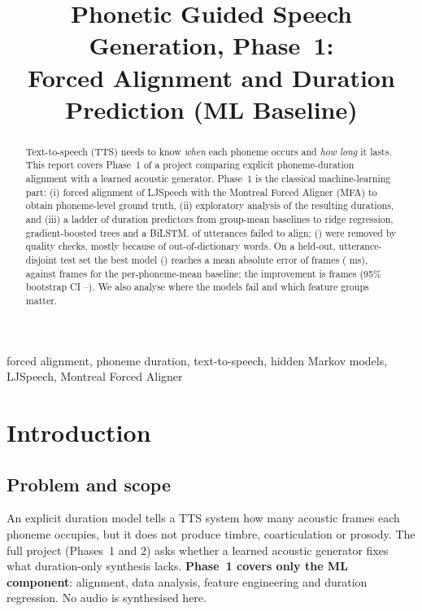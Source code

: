 \documentclass[conference]{IEEEtran}
\begin{document}
\title{Phonetic Guided Speech Generation, Phase~1:\\Forced Alignment and Duration Prediction (ML Baseline)}
\author{\IEEEauthorblockN{\teamA, \teamB, \teamC, \teamD, \teamE}
}
\maketitle

\begin{abstract}
Text-to-speech (TTS) needs to know \emph{when} each phoneme occurs and \emph{how long} it lasts.
This report covers Phase~1 of a project comparing explicit phoneme-duration alignment with a learned acoustic generator.
Phase~1 is the classical machine-learning part: (i) forced alignment of LJSpeech with the Montreal Forced Aligner (MFA) to obtain phoneme-level ground truth,
(ii) exploratory analysis of the resulting durations, and (iii) a ladder of duration predictors from group-mean baselines to ridge regression, gradient-boosted trees and a BiLSTM.
\nFailed{} of \nClips{} utterances failed to align; \nExcluded{} (\pctExcluded{}) were removed by quality checks, mostly because of out-of-dictionary words.
On a held-out, utterance-disjoint test set the best model (\bestModel) reaches a mean absolute error of \maeBest{} frames (\maeBestMs{} ms),
against \maeBase{} frames for the per-phoneme-mean baseline; the improvement is \gainFrames{} frames (95\% bootstrap CI \gainLow--\gainHigh).
We also analyse where the models fail and which feature groups matter.
\end{abstract}

\begin{IEEEkeywords}
forced alignment, phoneme duration, text-to-speech, hidden Markov models, LJSpeech, Montreal Forced Aligner
\end{IEEEkeywords}

\section{Introduction}
\subsection{Problem and scope}
An explicit duration model tells a TTS system how many acoustic frames each phoneme occupies, but it does not produce timbre, coarticulation or prosody.
The full project (Phases~1 and 2) asks whether a learned acoustic generator fixes what duration-only synthesis lacks.
\textbf{Phase~1 covers only the ML component}: alignment, data analysis, feature engineering and duration regression. No audio is synthesised here.
\end{document}
